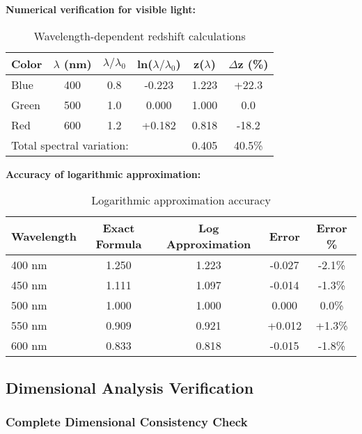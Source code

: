 \documentclass[12pt,a4paper]{article}
\begin{document}
	\textbf{Numerical verification for visible light:}
	\begin{table}[htbp]
		\centering
		\caption{Wavelength-dependent redshift calculations}
		\label{tab:redshift_calculations}
		\begin{tabular}{lccccc}
			\toprule
			\textbf{Color} & \textbf{$\lambda$ (nm)} & \textbf{$\lambda/\lambda_0$} & \textbf{ln($\lambda/\lambda_0$)} & \textbf{z($\lambda$)} & \textbf{$\Delta$z (\%)} \\
			\midrule
			Blue & 400 & 0.8 & -0.223 & 1.223 & +22.3 \\
			Green & 500 & 1.0 & 0.000 & 1.000 & 0.0 \\
			Red & 600 & 1.2 & +0.182 & 0.818 & -18.2 \\
			\midrule
			\multicolumn{4}{l}{Total spectral variation:} & 0.405 & 40.5\% \\
			\bottomrule
		\end{tabular}
	\end{table}
	
	\textbf{Accuracy of logarithmic approximation:}
	\begin{table}[htbp]
		\centering
		\caption{Logarithmic approximation accuracy}
		\label{tab:redshift_accuracy}
		\begin{tabular}{lcccc}
			\toprule
			\textbf{Wavelength} & \textbf{Exact Formula} & \textbf{Log Approximation} & \textbf{Error} & \textbf{Error \%} \\
			\midrule
			400 nm & 1.250 & 1.223 & -0.027 & -2.1\% \\
			450 nm & 1.111 & 1.097 & -0.014 & -1.3\% \\
			500 nm & 1.000 & 1.000 & 0.000 & 0.0\% \\
			550 nm & 0.909 & 0.921 & +0.012 & +1.3\% \\
			600 nm & 0.833 & 0.818 & -0.015 & -1.8\% \\
			\bottomrule
		\end{tabular}
	\end{table}
	
	\subsection{Dimensional Analysis Verification}
	\label{subsec:dimensional_verification}
	
	\subsubsection{Complete Dimensional Consistency Check}
	
\end{document}
